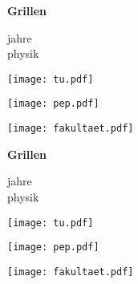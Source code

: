 \documentclass[paper=landscape]{scrartcl}
\begin{document}
\vfill

\begin{center}
  \fontsize{70}{70}\selectfont\bfseries%
  Grillen
\end{center}

\vfill


\begin{center}
  \begin{minipage}[b]{0.25\textwidth}
    \raggedleft
        \fontsize{45}{45}\selectfont{} jahre\\[.05cm] physik
  \end{minipage}
    \begin{minipage}[b]{.74\textwidth}
    \raggedright
    \texttt{[image: tu.pdf]}
  \end{minipage}
\end{center}

\newpage

\begin{minipage}{0.49\linewidth}%
  \raggedright
  \texttt{[image: pep.pdf]}%
\end{minipage}%
\begin{minipage}{0.48\linewidth}%
  \raggedleft%
  \texttt{[image: fakultaet.pdf]}%
\end{minipage}%

\vfill

\begin{center}
  \fontsize{70}{70}\selectfont\bfseries%
  Grillen \\[1em]
\end{center}

\vfill


\begin{center}
  \begin{minipage}[b]{0.25\textwidth}
    \raggedleft
        \fontsize{45}{45}\selectfont{} jahre\\[.05cm] physik
  \end{minipage}
    \begin{minipage}[b]{.74\textwidth}
    \raggedright
    \texttt{[image: tu.pdf]}
  \end{minipage}
\end{center}

\newpage

\begin{minipage}{0.49\linewidth}%
  \raggedright
  \texttt{[image: pep.pdf]}%
\end{minipage}%
\begin{minipage}{0.48\linewidth}%
  \raggedleft%
  \texttt{[image: fakultaet.pdf]}%
\end{minipage}%
\end{document}
